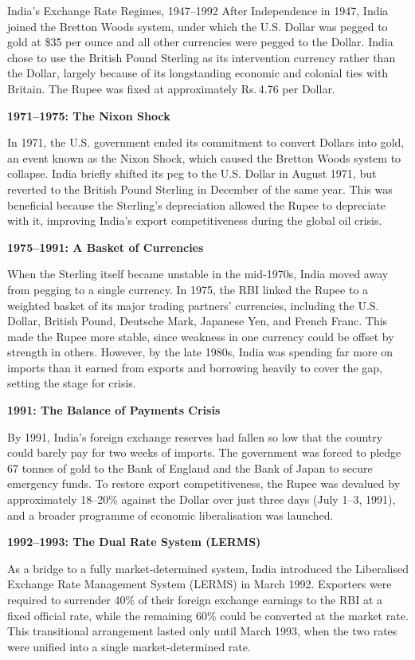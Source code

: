\documentclass[12pt,a4paper]{article}
\begin{document}
\begin{casestudybox}{India's Exchange Rate Regimes, 1947--1992}
After Independence in 1947, India joined the Bretton Woods system, under which the U.S. Dollar was pegged to gold at \$35 per ounce and all other currencies were pegged to the Dollar. India chose to use the British Pound Sterling as its intervention currency rather than the Dollar, largely because of its longstanding economic and colonial ties with Britain. The Rupee was fixed at approximately Rs.\,4.76 per Dollar.

\medskip
\textbf{1971--1975: The Nixon Shock}

In 1971, the U.S. government ended its commitment to convert Dollars into gold, an event known as the Nixon Shock, which caused the Bretton Woods system to collapse. India briefly shifted its peg to the U.S. Dollar in August 1971, but reverted to the British Pound Sterling in December of the same year. This was beneficial because the Sterling's depreciation allowed the Rupee to depreciate with it, improving India's export competitiveness during the global oil crisis.

\medskip
\textbf{1975--1991: A Basket of Currencies}

When the Sterling itself became unstable in the mid-1970s, India moved away from pegging to a single currency. In 1975, the RBI linked the Rupee to a weighted basket of its major trading partners' currencies, including the U.S. Dollar, British Pound, Deutsche Mark, Japanese Yen, and French Franc. This made the Rupee more stable, since weakness in one currency could be offset by strength in others. However, by the late 1980s, India was spending far more on imports than it earned from exports and borrowing heavily to cover the gap, setting the stage for crisis.

\medskip
\textbf{1991: The Balance of Payments Crisis}

By 1991, India's foreign exchange reserves had fallen so low that the country could barely pay for two weeks of imports. The government was forced to pledge 67 tonnes of gold to the Bank of England and the Bank of Japan to secure emergency funds. To restore export competitiveness, the Rupee was devalued by approximately 18--20\% against the Dollar over just three days (July 1--3, 1991), and a broader programme of economic liberalisation was launched.

\medskip
\textbf{1992--1993: The Dual Rate System (LERMS)}

As a bridge to a fully market-determined system, India introduced the Liberalised Exchange Rate Management System (LERMS) in March 1992. Exporters were required to surrender 40\% of their foreign exchange earnings to the RBI at a fixed official rate, while the remaining 60\% could be converted at the market rate. This transitional arrangement lasted only until March 1993, when the two rates were unified into a single market-determined rate.

\end{casestudybox}
\end{document}
